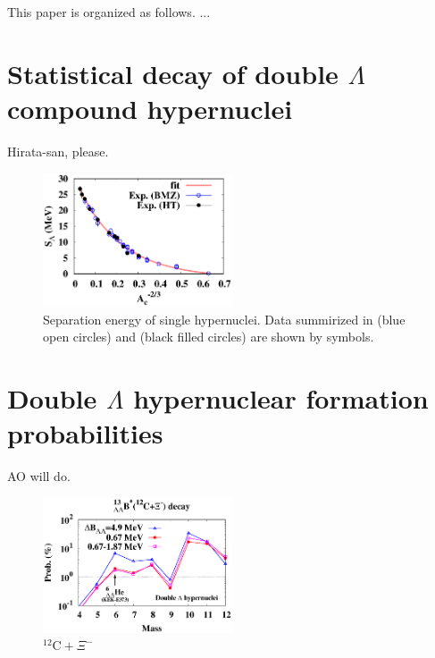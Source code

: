 \documentclass{ptephy_v1}
\begin{document}
This paper is organized as follows.
...

\section{Statistical decay of double $\Lambda$ compound hypernuclei}
\label{Sec:theory}

Hirata-san, please.

\begin{figure}[bthp]
\begin{center}
\includegraphics[width=0.5\textwidth]{SL.eps}%
\end{center}
\caption{
Separation energy of single hypernuclei.
Data summirized in \cite{BMZ} (blue open circles) and \cite{HT} (black filled circles)
are shown by symbols.
}
\label{Fig:SL}
\end{figure}

\section{Double $\Lambda$ hypernuclear formation probabilities}
\label{Sec:results}

AO will do.

\begin{figure}[htbp]
\begin{center}
\includegraphics[width=0.5\textwidth]{C12Xi-cas.eps}%
\end{center}
\caption{
$^{12}\mathrm{C}+\Xi^-$
}
\label{Fig:C12Xi}
\end{figure}
\end{document}
